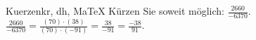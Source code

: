 \begin{MAufgabe}{Kuerzen}{kr, dh, MaTeX}
K\"urzen Sie soweit m\"oglich: $\frac{2660}{-6370}$.\\ 
\ifLsg\MLoesung
\quad $\frac{2660}{-6370}=\frac{(70)\cdot(38)}{(70)\cdot(-91)}=\frac{38}{-91}=\frac{-38}{91}$.\else\relax\fi
 \end{MAufgabe}